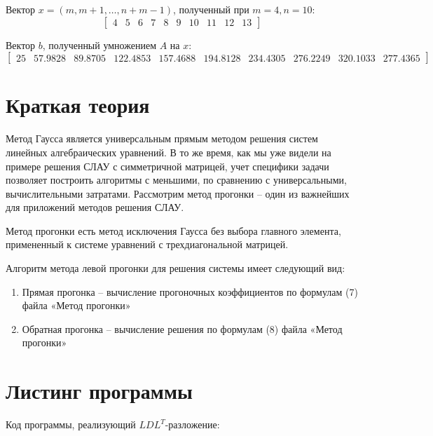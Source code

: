 \documentclass[12pt]{report}
\begin{document}
Вектор $x = (m, m+1, \ldots, n+m-1)$, полученный при $m = 4, n = 10$:
\[
\begin{bmatrix}
   4 & 5 & 6 & 7 & 8 & 9 & 10 & 11 & 12 & 13  
\end{bmatrix}
\]

Вектор $b$, полученный умножением $A$ на $x$:
\[
\begin{bmatrix}
   25 & 57.9828 & 89.8705 & 122.4853 & 157.4688 & 194.8128 & 234.4305 & 276.2249 & 320.1033 & 277.4365
\end{bmatrix}
\]


\section{Краткая теория}


Метод Гаусса является универсальным прямым методом решения систем линейных алгебраических уравнений. В то же время, как мы уже видели на примере решения СЛАУ с симметричной матрицей, учет специфики задачи позволяет построить алгоритмы с меньшими, по сравнению с универсальными, вычислительными затратами. Рассмотрим метод прогонки – один из важнейших для приложений методов решения СЛАУ. 

Метод прогонки есть метод исключения Гаусса без выбора главного элемента, примененный к системе уравнений с трехдиагональной матрицей.

Алгоритм метода левой прогонки для решения системы имеет следующий вид:
\begin{enumerate}
	\item Прямая прогонка – вычисление прогоночных коэффициентов по формулам (7) файла «Метод прогонки»
	\item Обратная прогонка – вычисление решения по формулам (8) файла «Метод прогонки»
\end{enumerate}

\section{Листинг программы}

\lstset{language=Python}
\lstset{extendedchars=\true}

Код программы, реализующий $LDL^{T}$-разложение: 
\end{document}
